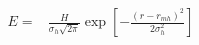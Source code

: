 \documentclass[12pt]{article}
\begin{document}
\begin{eqnarray*}
 E = & \frac{H}{\sigma_h\sqrt{2\pi}} \exp\left[-\frac{(r-r_{mh})^2}{2\sigma_h^2}\right]
\end{eqnarray*}
\end{document}
